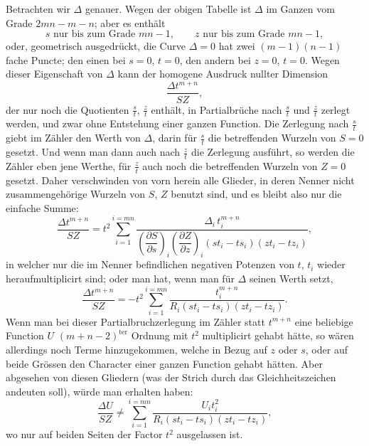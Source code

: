 \documentclass[10pt]{article}
\begin{document}
Betrachten wir $\Delta$ genauer. Wegen der obigen Tabelle ist $\Delta$ im Ganzen vom Grade $2mn-m-n$; aber es enthält
\[
s\text{ nur bis zum Grade }mn-1,
\qquad
z\text{ nur bis zum Grade }mn-1,
\]
oder, geometrisch ausgedrückt, die Curve $\Delta=0$ hat zwei $(m-1)(n-1)$fache Puncte; den einen bei $s=0$, $t=0$, den andern bei $z=0$, $t=0$. Wegen dieser Eigenschaft von $\Delta$ kann der homogene Ausdruck nullter Dimension
\[
\frac{\Delta t^{m+n}}{SZ},
\]
der nur noch die Quotienten $\frac{s}{t}$, $\frac{z}{t}$ enthält, in Partialbrüche nach $\frac{s}{t}$ und $\frac{z}{t}$ zerlegt werden, und zwar ohne Entstehung einer ganzen Function. Die Zerlegung nach $\frac{s}{t}$ giebt im Zähler den Werth von $\Delta$, darin für $\frac{s}{t}$ die betreffenden Wurzeln von $S=0$ gesetzt. Und wenn man dann auch nach $\frac{z}{t}$ die Zerlegung ausführt, so werden die Zähler eben jene Werthe, für $\frac{z}{t}$ auch noch die betreffenden Wurzeln von $Z=0$ gesetzt. Daher verschwinden von vorn herein alle Glieder, in deren Nenner nicht zusammengehörige Wurzeln von $S$, $Z$ benutzt sind, und es bleibt also nur die einfache Summe:
\[
\frac{\Delta t^{m+n}}{SZ}
=t^2\sum_{i=1}^{i=mn}
\frac{\Delta_i\,t_i^{m+n}}
{\left(\dfrac{\partial S}{\partial s}\right)_i\left(\dfrac{\partial Z}{\partial z}\right)_i(st_i-ts_i)(zt_i-tz_i)},
\]
in welcher nur die im Nenner befindlichen negativen Potenzen von $t$, $t_i$ wieder heraufmultiplicirt sind; oder man hat, wenn man für $\Delta$ seinen Werth setzt,
\[
\frac{\Delta t^{m+n}}{SZ}
=-t^2\sum_{i=1}^{i=mn}
\frac{t_i^{m+n}}{R_i(st_i-ts_i)(zt_i-tz_i)}.
\]
Wenn man bei dieser Partialbruchzerlegung im Zähler statt $t^{m+n}$ eine beliebige Function $U$ $(m+n-2)^{\text{ter}}$ Ordnung mit $t^2$ multiplicirt gehabt hätte, so wären allerdings noch Terme hinzugekommen, welche in Bezug auf $z$ oder $s$, oder auf beide Grössen den Character einer ganzen Function gehabt hätten. Aber abgesehen von diesen Gliedern (was der Strich durch das Gleichheitszeichen andeuten soll), würde man erhalten haben:
\[
\frac{\Delta U}{SZ}\not=
\sum_{i=1}^{i=mn}
\frac{U_i t_i^2}{R_i(st_i-ts_i)(zt_i-tz_i)},
\]
wo nur auf beiden Seiten der Factor $t^2$ ausgelassen ist.
\end{document}
